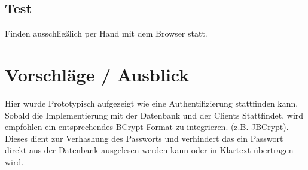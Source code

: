 \documentclass[german]{book}
\begin{document}
\subsection{Test}
Finden ausschließlich per Hand mit dem Browser statt. 

\section{Vorschläge / Ausblick}
Hier wurde Prototypisch aufgezeigt wie eine Authentifizierung stattfinden kann. Sobald die Implementierung mit der Datenbank und der Clients Stattfindet, wird empfohlen ein entsprechendes BCrypt Format zu integrieren. (z.B. JBCrypt). Dieses dient zur Verhashung des Passworts und verhindert das ein Passwort direkt aus der Datenbank ausgelesen werden kann oder in Klartext übertragen wird. 
\newline
\newline
\end{document}
